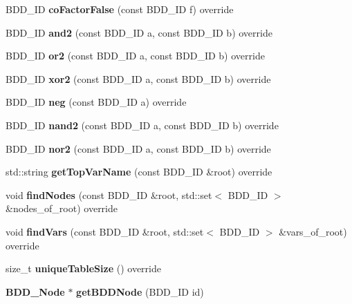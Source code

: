 \begin{DoxyCompactItemize}
\item 
B\+D\+D\+\_\+\+ID {\bfseries co\+Factor\+False} (const B\+D\+D\+\_\+\+ID f) override\label{classClassProject_1_1Manager_ac9621e396f35aebfefa623a5c67e32a1}

\item 
B\+D\+D\+\_\+\+ID {\bfseries and2} (const B\+D\+D\+\_\+\+ID a, const B\+D\+D\+\_\+\+ID b) override\label{classClassProject_1_1Manager_a75bd703f518ab88006bb2b493569ba08}

\item 
B\+D\+D\+\_\+\+ID {\bfseries or2} (const B\+D\+D\+\_\+\+ID a, const B\+D\+D\+\_\+\+ID b) override\label{classClassProject_1_1Manager_a0b0f8f45f547343dd165357900f155d0}

\item 
B\+D\+D\+\_\+\+ID {\bfseries xor2} (const B\+D\+D\+\_\+\+ID a, const B\+D\+D\+\_\+\+ID b) override\label{classClassProject_1_1Manager_a210d71defa6813536c7c4e4007bdd67e}

\item 
B\+D\+D\+\_\+\+ID {\bfseries neg} (const B\+D\+D\+\_\+\+ID a) override\label{classClassProject_1_1Manager_a6c83a83001023096dd68183f40ee80b3}

\item 
B\+D\+D\+\_\+\+ID {\bfseries nand2} (const B\+D\+D\+\_\+\+ID a, const B\+D\+D\+\_\+\+ID b) override\label{classClassProject_1_1Manager_a94abdd8d633d6e52a052838305f97f36}

\item 
B\+D\+D\+\_\+\+ID {\bfseries nor2} (const B\+D\+D\+\_\+\+ID a, const B\+D\+D\+\_\+\+ID b) override\label{classClassProject_1_1Manager_a3271fba879ca737e9566c079629841c5}

\item 
std\+::string {\bfseries get\+Top\+Var\+Name} (const B\+D\+D\+\_\+\+ID \&root) override\label{classClassProject_1_1Manager_a7238da7832b931611dbfd273800360e2}

\item 
void {\bfseries find\+Nodes} (const B\+D\+D\+\_\+\+ID \&root, std\+::set$<$ B\+D\+D\+\_\+\+ID $>$ \&nodes\+\_\+of\+\_\+root) override\label{classClassProject_1_1Manager_a9d465fdff670b0bd9ef4a35ab9611f25}

\item 
void {\bfseries find\+Vars} (const B\+D\+D\+\_\+\+ID \&root, std\+::set$<$ B\+D\+D\+\_\+\+ID $>$ \&vars\+\_\+of\+\_\+root) override\label{classClassProject_1_1Manager_a759513c0bb7447bfb05a82a818ab22eb}

\item 
size\+\_\+t {\bfseries unique\+Table\+Size} () override\label{classClassProject_1_1Manager_a0b54ce30834a6044fc9eb8e85550c5a8}

\item 
{\bf B\+D\+D\+\_\+\+Node} $\ast$ {\bfseries get\+B\+D\+D\+Node} (B\+D\+D\+\_\+\+ID id)\label{classClassProject_1_1Manager_a1f4669617591b7c3d9e36620a547e282}

\end{DoxyCompactItemize}
